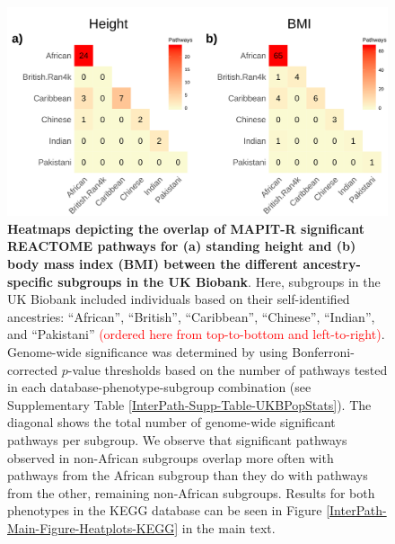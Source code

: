 \documentclass[10pt]{article}
\begin{document}
\setlength{\footskip}{1cm}
\begin{figure}[htbp]
\centering
\includegraphics[width = \textwidth]{Images/Supp/InterPath_Supp_Figure_Heatplots_REACTOME_vs5.png}
\caption{\textbf{Heatmaps depicting the overlap of MAPIT-R significant REACTOME pathways for (a) standing height and (b) body mass index (BMI) between the different ancestry-specific subgroups in the UK Biobank}. Here, subgroups in the UK Biobank included individuals based on their self-identified ancestries: ``African'', ``British'', ``Caribbean'', ``Chinese'', ``Indian'', and ``Pakistani'' \textcolor{red}{(ordered here from top-to-bottom and left-to-right)}. Genome-wide significance was determined by using Bonferroni-corrected $p$-value thresholds based on the number of pathways tested in each database-phenotype-subgroup combination (see Supplementary Table \ref{InterPath-Supp-Table-UKBPopStats}). The diagonal shows the total number of genome-wide significant pathways per subgroup. We observe that significant pathways observed in non-African subgroups overlap more often with pathways from the African subgroup than they do with pathways from the other, remaining non-African subgroups. Results for both phenotypes in the KEGG database can be seen in Figure \ref{InterPath-Main-Figure-Heatplots-KEGG} in the main text.}
\label{InterPath-Supp-Figure-Heatplots-REACTOME}
\end{figure}
\clearpage
\setlength{\footskip}{1cm}

\end{document}
